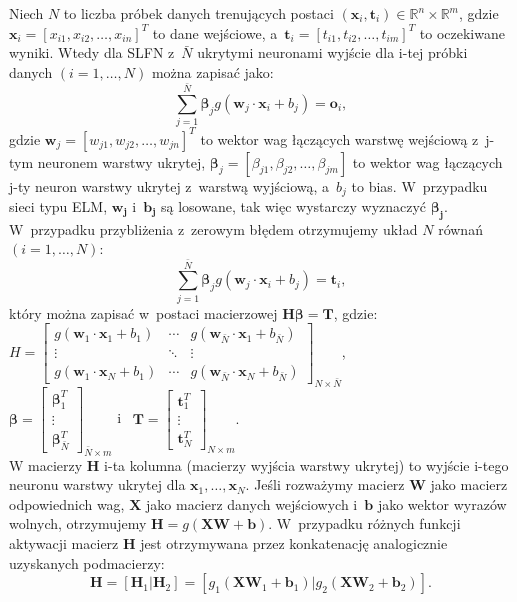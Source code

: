 \documentclass[pl]{minipw} %
\begin{document}
Niech $N$ to liczba próbek danych trenujących postaci $(\bm{x}_i, \bm{t}_i) \in \mathbb{R}^n \times \mathbb{R}^m$, gdzie $\bm{x}_i = [x_{i1}, x_{i2}, \dots,  x_{in}]^T$ to dane wejściowe, a~$\bm{t}_i = [t_{i1}, t_{i2}, \dots,  t_{im}]^T$ to oczekiwane wyniki. Wtedy dla SLFN z~$\bar{N}$ ukrytymi neuronami wyjście dla i-tej próbki danych $(i=1,\dots,N)$ można zapisać jako:
\begin{equation}
\sum_{j=1}^{\bar{N}} \bm{\beta}_j g (\bm{w}_j \cdot \bm{x}_i + b_j)  = \bm{o}_i,
\end{equation}
gdzie $\bm{w}_j = [w_{j1}, w_{j2},\dots,w_{jn}]^T$ to wektor wag łączących warstwę wejściową z~j-tym neuronem warstwy ukrytej, $\bm{\beta}_j = [\beta_{j1}, \beta_{j2}, \dots, \beta_{jm}]$ to wektor wag łączących j-ty neuron warstwy ukrytej z~warstwą wyjściową, a~$b_j$ to bias. W~przypadku sieci typu ELM, $\bm{w_j}$ i~$\bm{b_j}$ są losowane, tak więc wystarczy wyznaczyć $\bm{\beta_j}$.  W~przypadku przybliżenia z~zerowym błędem otrzymujemy układ $N$ równań $(i=1,\dots,N)$:
\begin{equation}
\sum_{j=1}^{\bar{N}} \bm{\beta}_j g (\bm{w}_j \cdot \bm{x}_i + b_j)  = \bm{t}_i,
\end{equation}
który można zapisać w~postaci macierzowej $\bm{H}\bm{\beta}=\bm{T}$, gdzie: \\
$
H = \begin{bmatrix}
 g(\bm{w}_1 \cdot \bm{x}_1 + b_1) & \cdots & g(\bm{w}_{\bar{N}} \cdot \bm{x}_1 + b_{\bar{N}}) \\
 \vdots & \ddots & \vdots \\
 g(\bm{w}_1 \cdot \bm{x}_N + b_1) & \cdots & g(\bm{w}_{\bar{N}} \cdot \bm{x}_N + b_{\bar{N}})
\end{bmatrix}_{N \times \bar{N}}$, \\
$\bm{\beta} = \begin{bmatrix} \bm{\beta}_1^T \\ \vdots \\ \bm{\beta}_{\bar{N}}^T \end{bmatrix}_{\bar{N} \times m}$ i~
 $ \bm{T} = \begin{bmatrix} \bm{t}_1^T \\ \vdots \\ \bm{t}_N^T \end{bmatrix}_{N \times m}. $\\
W macierzy $\bm{H}$ i-ta kolumna (macierzy wyjścia warstwy ukrytej) to wyjście i-tego neuronu warstwy ukrytej dla $\bm{x}_1, \dots, \bm{x}_N$. Jeśli rozważymy macierz $\bm{W}$ jako macierz odpowiednich wag, $\bm{X}$ jako macierz danych wejściowych i~$\bm{b}$ jako wektor wyrazów wolnych, otrzymujemy $\bm{H} = g(\bm{XW} + \bm{b})$. W~przypadku różnych funkcji aktywacji macierz $\bm{H}$ jest otrzymywana przez konkatenację analogicznie uzyskanych podmacierzy: 
\begin{equation}
\bm{H} = [\bm{H}_1 | \bm{H}_2] = [g_1(\bm{XW}_1 + \bm{b}_1) | g_2(\bm{XW}_2 + \bm{b}_2)]. 
\end{equation}
\end{document}
